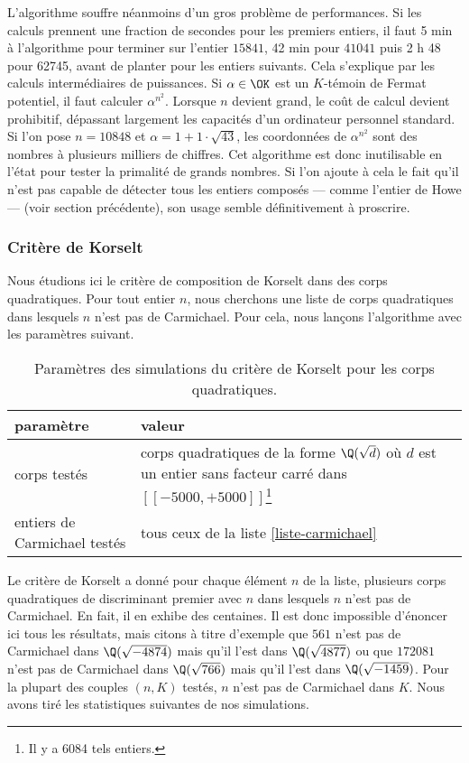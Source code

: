 L'algorithme souffre néanmoins d'un gros problème de performances. Si les calculs prennent une fraction de secondes pour les premiers entiers, il faut 5 min à l'algorithme pour terminer sur l'entier $15841$, 42 min pour $41041$ puis 2 h 48 pour 62745, avant de planter pour les entiers suivants. Cela s'explique par les calculs intermédiaires de puissances. Si $\alpha\in \OK$ est un $K$-témoin de Fermat potentiel, il faut calculer $\alpha^{n^2}$. Lorsque $n$ devient grand, le coût de calcul devient prohibitif, dépassant largement les capacités d'un ordinateur personnel standard. Si l'on pose $n = 10848$ et $\alpha = 1 + 1\cdot \sqrt{43}$, les coordonnées de $\alpha^{n^2}$ sont des nombres à plusieurs milliers de chiffres. Cet algorithme est donc inutilisable en l'état pour tester la primalité de grands nombres. Si l'on ajoute à cela le fait qu'il n'est pas capable de détecter tous les entiers composés — comme l'entier de Howe — (voir section précédente), son usage semble définitivement à proscrire.
	

\subsubsection{Critère de Korselt}

Nous étudions ici le critère de composition de Korselt \label{test-primalite-korselt} dans des corps quadratiques. Pour tout entier $n$, nous cherchons une liste de corps quadratiques dans lesquels $n$ n'est pas de Carmichael. Pour cela, nous lançons l'algorithme avec les paramètres suivant.

\begin{table}[H]\label{param-korselt-quadra}
	\begin{center}
		\begin{tabularx}{\textwidth}{|Y|Y|}
			\hline
			paramètre & valeur \\
			\hline
			\hline
			corps testés & corps quadratiques de la forme $\Q(\sqrt{d})$ où $d$ est un entier sans facteur carré dans $[\![-5000, +5000]\!]$\footnote{Il y a 6084 tels entiers.} \\\hline
			entiers de Carmichael testés & tous ceux de la liste \ref{liste-carmichael}  \\\hline
		\end{tabularx}
		\caption{Paramètres des simulations du critère de Korselt pour les corps quadratiques.}
	\end{center}
\end{table}

Le critère de Korselt a donné pour chaque élément $n$ de la liste, plusieurs corps quadratiques de discriminant premier avec $n$ dans lesquels $n$ n'est pas de Carmichael. En fait, il en exhibe des centaines. Il est donc impossible d'énoncer ici tous les résultats, mais citons à titre d'exemple que $561$ n'est pas de Carmichael dans $\Q(\sqrt{-4874})$ mais qu'il l'est dans $\Q(\sqrt{4877})$ ou que $172081$ n'est pas de Carmichael dans $\Q(\sqrt{766})$ mais qu'il l'est dans $\Q(\sqrt{-1459})$. Pour la plupart des couples $(n, K)$ testés, $n$ n'est pas de Carmichael dans $K$. Nous avons tiré les statistiques suivantes de nos simulations.

